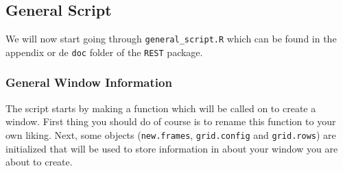 \documentclass[a4paper]{article}\usepackage[]{graphicx}\usepackage[]{color}
\begin{document}
\subsection{General Script}
We will now start going through \texttt{general\_script.R} which can be found in
the appendix or de \verb|doc| folder of the \verb|REST| package.

\subsubsection{General Window Information}
\noindent The script starts by making a function which will be called on to
create a window. First thing you should do of course is to rename this function
to your own liking. Next, some objects (\verb|new.frames|, \verb|grid.config| and \verb|grid.rows|) are initialized that will be used to
store information in about your window you are about to create. 
\end{document}

